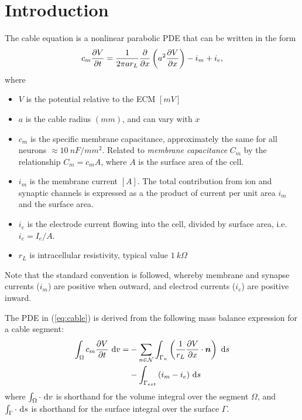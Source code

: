 \section*{Introduction}

The cable equation is a nonlinear parabolic PDE that can be written in the form
\begin{equation}
    \label{eq:cable}
    c_m \frac{\partial{V}}{\partial{t}} = \frac{1}{2\pi a r_{L}} \frac{\partial{}}{\partial{x}} \left( a^2 \frac{\partial{V}}{\partial{x}} \right) - i_m + i_e,
\end{equation}
where
\begin{itemize}
    \item $V$ is the potential relative to the ECM $[mV]$
    \item $a$ is the cable radius $(mm)$, and can vary with $x$
    \item $c_m$ is the {specific membrane capacitance}, approximately the same for all neurons $\approx 10~nF/mm^2$. Related to \emph{membrane capacitance} $C_m$ by the relationship $C_m=c_{m}A$, where $A$ is the surface area of the cell.
    \item $i_m$ is the membrane current $[A]$. The total contribution from ion and synaptic channels is expressed as a the product of current per unit area $i_m$ and the surface area.
    \item $i_e$ is the electrode current flowing into the cell, divided by surface area, i.e. $i_e=I_e/A$.
    \item $r_L$ is intracellular resistivity, typical value $1~k\Omega$
\end{itemize}

Note that the standard convention is followed, whereby membrane and synapse currents ($i_m$) are positive when outward, and electrod currents ($i_e$) are positive inward.

The PDE in (\ref{eq:cable}) is derived from the following mass balance expression for a cable segment:
\begin{align}
    \int_{\Omega}{c_m \frac{\partial{V}}{\partial{t}} } ~\text{d}{v} =
        & - \sum_{n\in\mathcal{N}} {\int_{\Gamma_{n}}  \left( \frac{1}{r_L}\frac{\partial{V}}{\partial{x}} \cdot \bm{n} \right) ~\text{d}{s} } \nonumber \\
        & - \int_{\Gamma_{ext}} {(i_m - i_e)} ~\text{d}{s}
    \label{eq:cable_balance}
\end{align}
where $\int_\Omega \cdot ~\text{d}{v}$ is shorthand for the volume  integral over the segment $\Omega$, and $\int_\Gamma \cdot ~\text{d}{s}$ is shorthand for the surface integral over the surface $\Gamma$.

